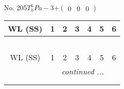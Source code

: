 \documentclass[fleqn,9pt,landscape]{jsarticle}
\begin{document}
\begin{center}
\begin{longtable}{ccccccc}
\end{longtable}
\end{center}
\newpage
No. 205\quad$T_{h}^{6}$\quad$Pa-3$\quad[ cubic ]\quad$+\begin{pmatrix} 0 & 0 & 0 \end{pmatrix}$
\begin{center}
\renewcommand{\arraystretch}{1.2}
\begin{longtable}{ccccccc}
 \hline \hline
WL (SS) & 1 & 2 & 3 & 4 & 5 & 6 \\ \hline \endfirsthead

\multicolumn{6}{l}{\tablename\ \thetable{}} \\
 \hline \hline
WL (SS) & 1 & 2 & 3 & 4 & 5 & 6 \\ \hline \endhead

 \hline \hline
\multicolumn{6}{r}{\footnotesize\it continued ...} \\ \endfoot

 \hline \hline
\multicolumn{6}{r}{} \\ \endlastfoot


\end{longtable}
\end{center}
\end{document}
